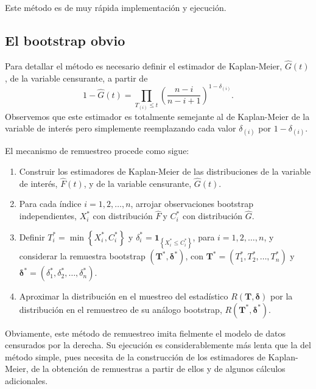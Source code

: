 \documentclass[
]{book}
\theoremstyle{break}
\theoremstyle{definition}
\theoremstyle{definition}
\theoremstyle{definition}
\theoremstyle{definition}
\theoremstyle{remark}
\begin{document}
Este método es de muy rápida implementación y ejecución.

\hypertarget{bootcen-obvio}{%
\subsection{El bootstrap obvio}\label{bootcen-obvio}}

Para detallar el método es necesario definir el estimador de
Kaplan-Meier, \(\hat{G}\left( t \right)\), de la variable censurante, a
partir
de\[1-\hat{G}\left( t \right) =\prod_{T_{(i)}\leq t}\left( \frac{n-i
}{n-i+1} \right)^{1-\delta _{(i)}}.\] Observemos que este
estimador es totalmente semejante al de Kaplan-Meier de la variable de
interés pero simplemente reemplazando cada valor
\(\delta _{(i)}\) por \(1-\delta _{(i)}\).

El mecanismo de remuestreo procede como sigue:

\begin{enumerate}
\def\labelenumi{\arabic{enumi}.}
\item
  Construir los estimadores de Kaplan-Meier de las distribuciones de
  la variable de interés, \(\hat{F}\left( t \right)\), y de la variable
  censurante, \(\hat{G}\left( t \right)\).
\item
  Para cada índice \(i=1,2,\ldots ,n\), arrojar observaciones bootstrap
  independientes, \(X_i^{\ast}\) con distribución \(\hat{F}\ \)y
  \(C_i^{\ast}\) con distribución \(\hat{G}\).
\item
  Definir \(T_i^{\ast}=\min \left\{ X_i^{\ast},C_i^{\ast}\right\}\) y
  \(\delta_i^{\ast}=\mathbf{1}_{\left\{ X_i^{\ast}\leq C_i^{\ast}\right\}}\), para \(i = 1, 2, \ldots, n\),
  y considerar la remuestra bootstrap
  \(\left( \mathbf{T}^{\ast},\boldsymbol{\delta}^{\ast}\right)\), con
  \(\mathbf{T}^{\ast}=\left( T_1^{\ast},T_2^{\ast}, \ldots, T_n^{\ast} \right)\) y \(\boldsymbol{\delta}^{\ast} = \left( \delta_1^{\ast}, \delta_2^{\ast},\ldots ,\delta_n^{\ast} \right)\).
\item
  Aproximar la distribución en el muestreo del estadístico
  \(R\left( \mathbf{T},\boldsymbol{\delta} \right)\) por la
  distribución en el remuestreo de su análogo bootstrap, \(R\left( \mathbf{T}^{\ast},\boldsymbol{\delta}^{\ast} \right)\).
\end{enumerate}

Obviamente, este método de remuestreo imita fielmente el modelo de datos
censurados por la derecha. Su ejecución es considerablemente más lenta
que la del método simple, pues necesita de la construcción de los
estimadores de Kaplan-Meier, de la obtención de remuestras a partir de
ellos y de algunos cálculos adicionales.
\end{document}
